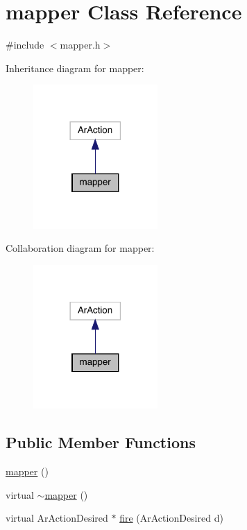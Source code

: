 \hypertarget{classmapper}{}\section{mapper Class Reference}
\label{classmapper}


{\ttfamily \#include $<$mapper.\+h$>$}



Inheritance diagram for mapper\+:\nopagebreak
\begin{figure}[H]
\begin{center}
\leavevmode
\includegraphics[width=134pt]{classmapper__inherit__graph}
\end{center}
\end{figure}


Collaboration diagram for mapper\+:\nopagebreak
\begin{figure}[H]
\begin{center}
\leavevmode
\includegraphics[width=134pt]{classmapper__coll__graph}
\end{center}
\end{figure}
\subsection*{Public Member Functions}
\begin{DoxyCompactItemize}
\item 
\mbox{\hyperlink{classmapper_a63253379db55193ffc58434c32657270}{mapper}} ()
\item 
virtual \mbox{\hyperlink{classmapper_aab426a3eb8681cf2c1137f658a6802a4}{$\sim$mapper}} ()
\item 
virtual Ar\+Action\+Desired $\ast$ \mbox{\hyperlink{classmapper_a9d8bd0abf6844385c45d8b3ccd7b8e87}{fire}} (Ar\+Action\+Desired d)
\end{DoxyCompactItemize}
